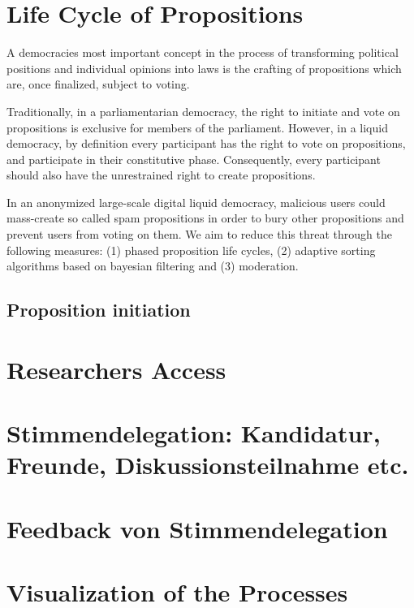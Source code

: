 \section{Life Cycle of Propositions}
\label{sec:Model_Propositions}
A democracies most important concept in the process of transforming political positions and individual opinions into laws is the crafting of propositions which are, once finalized, subject to voting.

Traditionally, in a parliamentarian democracy, the right to initiate and vote on propositions is exclusive for members of the parliament.
However, in a liquid democracy, by definition every participant has the right to vote on propositions, and participate in their constitutive phase. Consequently, every participant should also have the unrestrained right to create propositions.

In an anonymized large-scale digital liquid democracy, malicious users could mass-create so called spam propositions in order to bury other propositions and prevent users from voting on them.
We aim to reduce this threat through the following measures: (1) phased proposition life cycles, (2) adaptive sorting algorithms based on bayesian filtering and (3) moderation.

\subsection{Proposition initiation}

\section{Researchers Access}
\label{sec:Model_ResearchersAccess}

\section{Stimmendelegation: Kandidatur, Freunde, Diskussionsteilnahme etc.}
\label{sec:Model_VoteDelegation}

\section{Feedback von Stimmendelegation}
\label{sec:Model_VoteFeedback}

\section{Visualization of the Processes}
\label{sec:Model_Visualization}